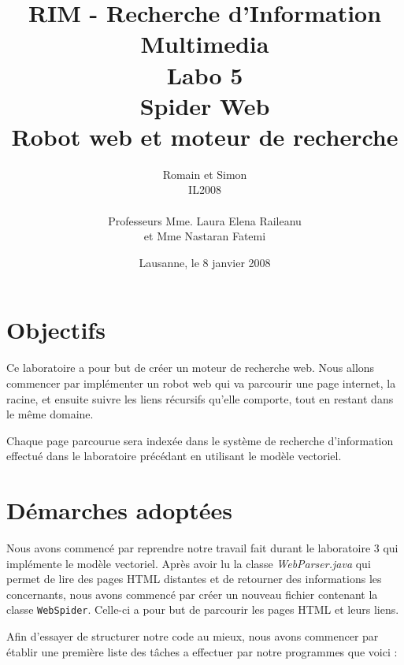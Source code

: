 \documentclass[a4paper, 11pt]{article}
\title{ %
\small{RIM - Recherche d'Information Multimedia} \\ \vspace{2cm}
\huge{Labo 5} \\ \vspace{1cm} 
Spider Web \\ 
\small{Robot web et moteur de recherche}}
\author{Romain \bsc{de Wolff} et Simon \bsc{Hintermann}\\ IL2008 \\ \vspace{2cm} \\ Professeurs Mme. Laura Elena Raileanu \\ et Mme Nastaran Fatemi \vspace{2cm} 
}
\date{Lausanne, le 8 janvier 2008}  %
\begin{document}
\maketitle
\thispagestyle{empty} %
\newpage
 \setcounter{page}{1} 

{\setlength{\baselineskip}{1.2\baselineskip}
\parskip=12pt
\section{Objectifs} 

Ce laboratoire a pour but de créer un moteur de recherche web. Nous allons commencer par implémenter un robot web qui va parcourir une page internet, la racine, et ensuite suivre les liens récursifs qu'elle comporte, tout en restant dans le même domaine. 

Chaque page parcourue sera indexée dans le système de recherche d'information effectué dans le laboratoire précédant en utilisant le modèle vectoriel. 

\section{Démarches adoptées} 

Nous avons commencé par reprendre notre travail fait durant le laboratoire 3 qui implémente le modèle vectoriel. Après avoir lu la classe \emph{WebParser.java} qui permet de lire des pages HTML distantes et de retourner des informations les concernants, nous avons commencé par créer un nouveau fichier contenant la classe \texttt{WebSpider}. Celle-ci a pour but de parcourir les pages HTML et leurs liens.

Afin d'essayer de structurer notre code au mieux, nous avons commencer par établir une première liste des tâches a effectuer par notre programmes que voici : 

}
\end{document}
